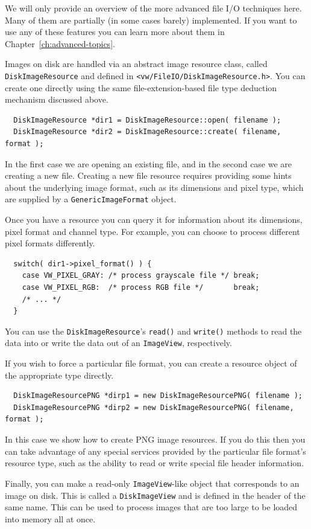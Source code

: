 We will only provide an overview of the more advanced file I/O
techniques here.  Many of them are partially (in some cases barely)
implemented.  If you want to use any of these features you can
learn more about them in Chapter~\ref{ch:advanced-topics}.

Images on disk are handled via an abstract image resource
class, called \verb#DiskImageResource# and defined in
\verb#<vw/FileIO/DiskImageResource.h>#.  You can create one directly
using the same file-extension-based file type deduction mechanism
discussed above.
\begin{verbatim}
  DiskImageResource *dir1 = DiskImageResource::open( filename );
  DiskImageResource *dir2 = DiskImageResource::create( filename, format );
\end{verbatim}
In the first case we are opening an existing file, and in the second
case we are creating a new file.  Creating a new file resource requires
providing some hints about the underlying image format, such as its
dimensions and pixel type, which are supplied by a \verb#GenericImageFormat#
object.

Once you have a resource you can query it for information about its
dimensions, pixel format and channel type.  For example, you can choose
to process different pixel formats differently.
\begin{verbatim}
  switch( dir1->pixel_format() ) {
    case VW_PIXEL_GRAY: /* process grayscale file */ break;
    case VW_PIXEL_RGB:  /* process RGB file */       break;
    /* ... */
  }
\end{verbatim}
You can use the \verb#DiskImageResource#'s \verb#read()# and \verb#write()#
methods to read the data into or write the data out of an \verb#ImageView#,
respectively.

If you wish to force a particular file format, you can create a resource
object of the appropriate type directly.
\begin{verbatim}
  DiskImageResourcePNG *dirp1 = new DiskImageResourcePNG( filename );
  DiskImageResourcePNG *dirp2 = new DiskImageResourcePNG( filename, format );
\end{verbatim}
In this case we show how to create PNG image resources.  If you do this
then you can take advantage of any special services provided by the
particular file format's resource type, such as the ability to read or
write special file header information.

Finally, you can make a read-only \verb#ImageView#-like object that
corresponds to an image on disk.  This is called a \verb#DiskImageView#
and is defined in the header of the same name.  This can be used to
process images that are too large to be loaded into memory all at once.

